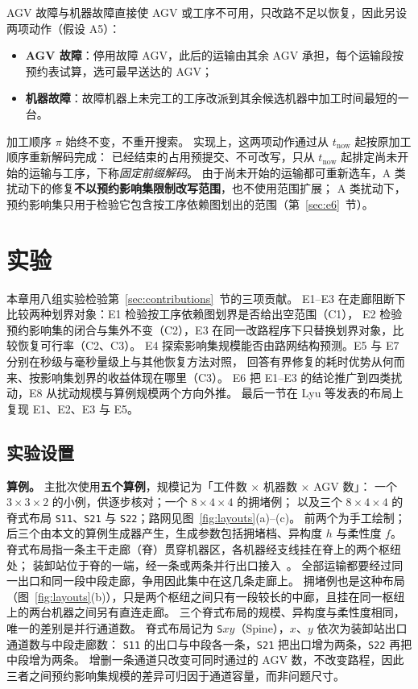 \documentclass[manuscript,screen,review]{acmart}
\begin{document}
AGV 故障与机器故障直接使 AGV 或工序不可用，只改路不足以恢复，因此另设两项动作（假设 A5）：
\begin{itemize}[leftmargin=1.5em,itemsep=0.15em]
\item \textbf{AGV 故障}：停用故障 AGV，此后的运输由其余 AGV 承担，每个运输段按预约表试算，选可最早送达的 AGV；
\item \textbf{机器故障}：故障机器上未完工的工序改派到其余候选机器中加工时间最短的一台。
\end{itemize}
加工顺序 \(\pi\) 始终不变，不重开搜索。
实现上，这两项动作通过从 \(t_{\mathrm{now}}\) 起按原加工顺序重新解码完成：
已经结束的占用预提交、不可改写，只从 \(t_{\mathrm{now}}\) 起排定尚未开始的运输与工序，下称\emph{固定前缀解码}。
由于尚未开始的运输都可重新选车，A 类扰动下的修复\textbf{不以预约影响集限制改写范围}，也不使用范围扩展；
A 类扰动下，预约影响集只用于检验它包含按工序依赖图划出的范围（第~\ref{sec:e6}~节）。


\section{实验}
\label{sec:experiments}

本章用八组实验检验第~\ref{sec:contributions}~节的三项贡献。
E1--E3 在走廊阻断下比较两种划界对象：E1 检验按工序依赖图划界是否给出空范围（C1），
E2 检验预约影响集的闭合与集外不变（C2），E3 在同一改路程序下只替换划界对象，比较恢复可行率（C2、C3）。
E4 探索影响集规模能否由路网结构预测。E5 与 E7 分别在秒级与毫秒量级上与其他恢复方法对照，
回答有界修复的耗时优势从何而来、按影响集划界的收益体现在哪里（C3）。
E6 把 E1--E3 的结论推广到四类扰动，E8 从扰动规模与算例规模两个方向外推。
最后一节在 Lyu 等发表的布局上复现 E1、E2、E3 与 E5。

\subsection{实验设置}
\label{sec:protocol}

\textbf{算例。}
主批次使用\textbf{五个算例}，规模记为「工件数 \(\times\) 机器数 \(\times\) AGV 数」：
一个 \(3\times3\times2\) 的小例，供逐步核对；一个 \(8\times4\times4\) 的拥堵例；
以及三个 \(8\times4\times4\) 的脊式布局 \texttt{S11}、\texttt{S21} 与 \texttt{S22}；路网见图~\ref{fig:layouts}(a)--(c)。
前两个为手工绘制；后三个由本文的算例生成器产生，生成参数包括拥堵档、异构度 \(h\) 与柔性度 \(f\)。
脊式布局指一条主干走廊（脊）贯穿机器区，各机器经支线挂在脊上的两个枢纽处；
装卸站位于脊的一端，经一条或两条并行出口接入~\cite{suh2022spine}。
全部运输都要经过同一出口和同一段中段走廊，争用因此集中在这几条走廊上。
拥堵例也是这种布局（图~\ref{fig:layouts}(b)），只是两个枢纽之间只有一段较长的中廊，且挂在同一枢纽上的两台机器之间另有直连走廊。
三个脊式布局的规模、异构度与柔性度相同，唯一的差别是并行通道数。
脊式布局记为 \texttt{S}\(xy\)（Spine），\(x\)、\(y\) 依次为装卸站出口通道数与中段走廊数：
\texttt{S11} 的出口与中段各一条，\texttt{S21} 把出口增为两条，\texttt{S22} 再把中段增为两条。
增删一条通道只改变可同时通过的 AGV 数，不改变路程，因此三者之间预约影响集规模的差异可归因于通道容量，而非问题尺寸。
\end{document}
